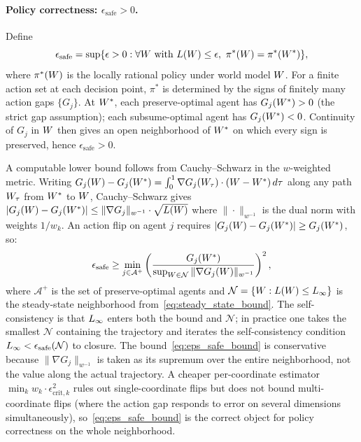 \paragraph{Policy correctness: $\epsilon_{\mathrm{safe}} > 0$.}
Define
\begin{equation*}
\epsilon_{\mathrm{safe}} = \sup \{\epsilon > 0 :
  \forall W \text{ with } L(W) \leq \epsilon,\
  \pi^*(W) = \pi^*(W^*)\},
\end{equation*}
where $\pi^*(W)$ is the locally rational policy under world model
$W$.  For a finite action set at each decision point, $\pi^*$ is
determined by the signs of finitely many action gaps $\{G_j\}$.  At
$W^*$, each preserve-optimal agent has $G_j(W^*) > 0$ (the strict
gap assumption); each subsume-optimal agent has $G_j(W^*) < 0$.
Continuity of $G_j$ in $W$ then gives an open neighborhood of
$W^*$ on which every sign is preserved, hence
$\epsilon_{\mathrm{safe}} > 0$.

A computable lower bound follows from Cauchy--Schwarz in the
$w$-weighted metric.  Writing
$G_j(W) - G_j(W^*) = \int_0^1 \nabla G_j(W_\tau) \cdot
(W - W^*) \, d\tau$
along any path $W_\tau$ from $W^*$ to $W$,
Cauchy--Schwarz gives
$|G_j(W) - G_j(W^*)| \leq \|\nabla G_j\|_{w^{-1}} \cdot \sqrt{L(W)}$
where $\|\cdot\|_{w^{-1}}$ is the dual norm with weights $1/w_k$.
An action flip on agent $j$ requires
$|G_j(W) - G_j(W^*)| \geq G_j(W^*)$, so:
\begin{equation}
\label{eq:eps_safe_bound}
\epsilon_{\mathrm{safe}} \geq
  \min_{j \in \mathcal{A}^+}
  \left( \frac{G_j(W^*)}
              {\sup_{W \in \mathcal{N}} \|\nabla G_j(W)\|_{w^{-1}}} \right)^2,
\end{equation}
where $\mathcal{A}^+$ is the set of preserve-optimal agents and
$\mathcal{N} = \{W : L(W) \leq L_\infty\}$ is the
steady-state neighborhood from~\eqref{eq:steady_state_bound}.  The
self-consistency is that $L_\infty$ enters both the bound and
$\mathcal{N}$; in practice one takes the smallest $\mathcal{N}$
containing the trajectory and iterates the self-consistency condition
$L_\infty < \epsilon_{\mathrm{safe}}(\mathcal{N})$ to closure.
The bound~\eqref{eq:eps_safe_bound} is conservative because
$\|\nabla G_j\|_{w^{-1}}$ is taken as its supremum over the entire
neighborhood, not the value along the actual trajectory.  A cheaper
per-coordinate estimator $\min_k w_k \cdot \epsilon_{\mathrm{crit},k}^2$
rules out single-coordinate flips but does not bound multi-coordinate
flips (where the action gap responds to error on several dimensions
simultaneously), so~\eqref{eq:eps_safe_bound} is the correct object
for policy correctness on the whole neighborhood.

